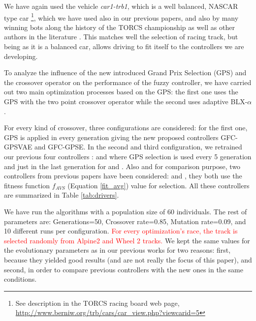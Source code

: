 \documentclass[10pt,journal,compsoc]{IEEEtran}
\begin{document}
We have again used the vehicle \textit{car1-trb1},
which is a well balanced, NASCAR type car \footnote{See description in
  the TORCS racing board web page,
  \url{http://www.berniw.org/trb/cars/car_view.php?viewcarid=5}},
which we have used also in our previous papers, and also by many
winning bots along the history of the TORCS championship
\cite{torcs5} as well as other authors in the literature
\cite{auteur2010,li2019reinforcement}. This matches well the selection
of racing track, but being as it is a balanced car, allows driving to
fit itself to the controllers we are developing.



To analyze the influence of the new introduced Grand Prix Selection
(GPS) and the crossover operator on the performance of the fuzzy
controller, we have carried out two main optimization processes based
on the GPS: the first one uses the GPS with the two point crossover
operator while the second uses adaptive BLX-$\alpha$.

For every kind of crossover, three configurations are considered: for
the first one, GPS is applied in every generation giving the new
proposed controllers {\sf GFC-GPSVAE} and {\sf GFC-GPSE}. 
In the second and third configuration, we retrained our previous four  controllers \cite{DBLP:conf/cig/SalemMG19}: {} and 
{} where GPS selection is used every 5 generation and just in the last generation for {} and {}.
Also and for comparison purpose, two controllers from previous papers have been considered: {}\cite{DBLP:conf/cig/SalemMG19} and {}\cite{salem_cig2018}, they both use the fitness function $f_{AVS}$ (Equation \ref{fit_avg}) value for selection.
All these controllers are summarized in Table \ref{tab:drivers}. 

We have run the algorithms with a population size of 60
individuals. The rest of parameters are: Generations=50, Crossover
rate=0.85, Mutation rate=0.09, and 10 different runs per
configuration. %
               \textcolor{red}{
For every optimization's race, the track is selected randomly from Alpine2 and Wheel 2 tracks.}
We kept the same values for the evolutionary parameters as in our previous works for two reasons: first, because they yielded good results (and are not really the focus of this paper), and second, in order to compare previous controllers with the new ones in the same conditions.
\end{document}
